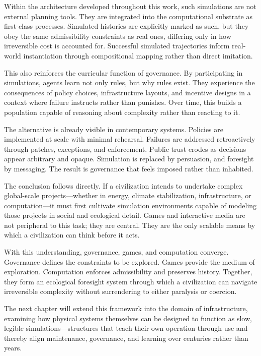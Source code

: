 \documentclass[12pt,oneside]{book}
\begin{document}
Within the architecture developed throughout this work, such simulations are not external planning tools. They are integrated into the computational substrate as first-class processes. Simulated histories are explicitly marked as such, but they obey the same admissibility constraints as real ones, differing only in how irreversible cost is accounted for. Successful simulated trajectories inform real-world instantiation through compositional mapping rather than direct imitation.

This also reinforces the curricular function of governance. By participating in simulations, agents learn not only rules, but why rules exist. They experience the consequences of policy choices, infrastructure layouts, and incentive designs in a context where failure instructs rather than punishes. Over time, this builds a population capable of reasoning about complexity rather than reacting to it.

The alternative is already visible in contemporary systems. Policies are implemented at scale with minimal rehearsal. Failures are addressed retroactively through patches, exceptions, and enforcement. Public trust erodes as decisions appear arbitrary and opaque. Simulation is replaced by persuasion, and foresight by messaging. The result is governance that feels imposed rather than inhabited.

The conclusion follows directly. If a civilization intends to undertake complex global-scale projects—whether in energy, climate stabilization, infrastructure, or computation—it must first cultivate simulation environments capable of modeling those projects in social and ecological detail. Games and interactive media are not peripheral to this task; they are central. They are the only scalable means by which a civilization can think before it acts.

With this understanding, governance, games, and computation converge. Governance defines the constraints to be explored. Games provide the medium of exploration. Computation enforces admissibility and preserves history. Together, they form an ecological foresight system through which a civilization can navigate irreversible complexity without surrendering to either paralysis or coercion.

The next chapter will extend this framework into the domain of infrastructure, examining how physical systems themselves can be designed to function as slow, legible simulations—structures that teach their own operation through use and thereby align maintenance, governance, and learning over centuries rather than years.
\end{document}
